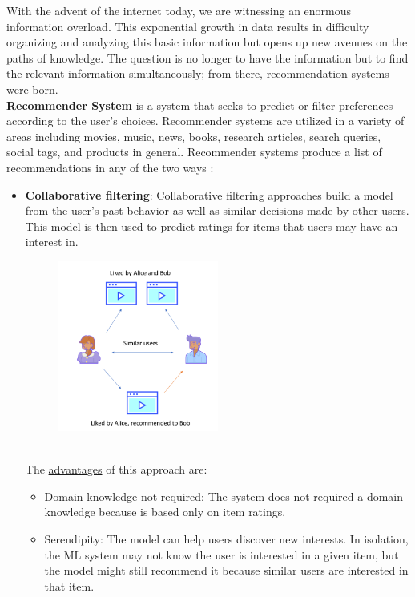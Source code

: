 \documentclass{article}
\begin{document}
With the advent of the internet today, we are witnessing an enormous information overload. This exponential growth in data results in difficulty organizing and analyzing this basic information but opens up new avenues on the paths of knowledge. The question is no longer to have the information but to find the relevant information simultaneously; from there, recommendation systems were born.\\ 
\textbf{Recommender System} is a system that seeks to predict or filter preferences according to the user’s choices. Recommender systems are utilized in a variety of areas including movies, music, news, books, research articles, search queries, social tags, and products in general. 
Recommender systems produce a list of recommendations in any of the two ways :
\begin{itemize}
      \item \textbf{Collaborative filtering}: Collaborative filtering approaches build a model from the user’s past behavior as well as similar decisions made by other users. This model is then used to predict ratings for items that users may have an interest in.\\
      \begin{figure}[h]
            \begin{center}
                  \includegraphics[width=0.5\textwidth]{images/Collaborative filtering.png}
            \end{center}
      \end{figure}\\
      The \underline{advantages} of this approach are:
      \begin{itemize}
            \item Domain knowledge not required: The system does not required a domain knowledge because is based only on item ratings.
            \item Serendipity: The model can help users discover new interests. In isolation, the ML system may not know the user is interested in a given item, but the model might still recommend it because similar users are interested in that item. 

\end{itemize}
\end{itemize}
\end{document}
